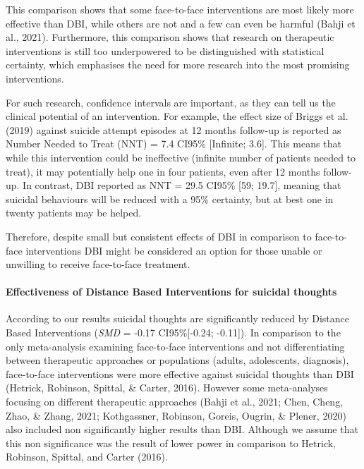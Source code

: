\documentclass[
  english,
  man]{apa6}
\let\oldparagraph\paragraph
\renewcommand{\paragraph}[1]{\oldparagraph{#1}\mbox{}}
\begin{document}
This comparison shows that some face-to-face interventions are most likely more effective than DBI, while others are not and a few can even be harmful (Bahji et al., 2021). Furthermore, this comparison shows that research on therapeutic interventions is still too underpowered to be distinguished with statistical certainty, which emphasises the need for more research into the most promising interventions.

For such research, confidence intervals are important, as they can tell us the clinical potential of an intervention. For example, the effect size of Briggs et al. (2019) against suicide attempt episodes at 12 months follow-up is reported as Number Needed to Treat (NNT) = 7.4 CI95\% {[}Infinite; 3.6{]}. This means that while this intervention could be ineffective (infinite number of patients needed to treat), it may potentially help one in four patients, even after 12 months follow-up. In contrast, DBI reported as NNT = 29.5 CI95\% {[}59; 19.7{]}, meaning that suicidal behaviours will be reduced with a 95\% certainty, but at best one in twenty patients may be helped.

Therefore, despite small but consistent effects of DBI in comparison to face-to-face interventions DBI might be considered an option for those unable or unwilling to receive face-to-face treatment.

\hypertarget{effectiveness-of-distance-based-interventions-for-suicidal-thoughts}{%
\paragraph{Effectiveness of Distance Based Interventions for suicidal thoughts}\label{effectiveness-of-distance-based-interventions-for-suicidal-thoughts}}

According to our results suicidal thoughts are significantly reduced by Distance Based Interventions (\emph{SMD} = -0.17 CI95\%{[}-0.24; -0.11{]}). In comparison to the only meta-analysis examining face-to-face interventions and not differentiating between therapeutic approaches or populations (adults, adolescents, diagnosis), face-to-face interventions were more effective against suicidal thoughts than DBI (Hetrick, Robinson, Spittal, \& Carter, 2016). However some meta-analyses focusing on different therapeutic approaches (Bahji et al., 2021; Chen, Cheng, Zhao, \& Zhang, 2021; Kothgassner, Robinson, Goreis, Ougrin, \& Plener, 2020) also included non significantly higher results than DBI. Although we assume that this non significance was the result of lower power in comparison to Hetrick, Robinson, Spittal, and Carter (2016).
\end{document}
